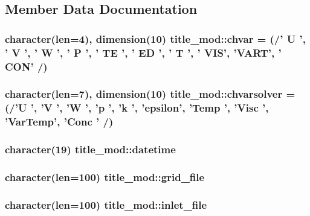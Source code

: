 \subsection{Member Data Documentation}
\hypertarget{classtitle__mod_aab37de0b88867f1916ce8cfc289e98dc}{
\subsubsection[{chvar}]{\setlength{\rightskip}{0pt plus 5cm}character(len=4), dimension(10) title\-\_\-mod\-::chvar = (/' U ', ' V ', ' W ', ' P ', ' T\-E ', ' E\-D ', ' T ', ' V\-I\-S', 'V\-A\-R\-T', ' C\-O\-N' /)}}\label{classtitle__mod_aab37de0b88867f1916ce8cfc289e98dc}
\hypertarget{classtitle__mod_a9472f9f42179093e161523ad2b634549}{
\subsubsection[{chvarsolver}]{\setlength{\rightskip}{0pt plus 5cm}character(len=7), dimension(10) title\-\_\-mod\-::chvarsolver = (/'U ', 'V ', 'W ', 'p ', 'k ', 'epsilon', 'Temp ', 'Visc ', 'Var\-Temp', 'Conc ' /)}}\label{classtitle__mod_a9472f9f42179093e161523ad2b634549}
\hypertarget{classtitle__mod_a8b3004768211b65f2678ca209f6672ba}{
\subsubsection[{datetime}]{\setlength{\rightskip}{0pt plus 5cm}character(19) title\-\_\-mod\-::datetime}}\label{classtitle__mod_a8b3004768211b65f2678ca209f6672ba}
\hypertarget{classtitle__mod_a998c71ccbb4580eb3b5e1bac6ec581d0}{
\subsubsection[{grid\-\_\-file}]{\setlength{\rightskip}{0pt plus 5cm}character(len=100) title\-\_\-mod\-::grid\-\_\-file}}\label{classtitle__mod_a998c71ccbb4580eb3b5e1bac6ec581d0}
\hypertarget{classtitle__mod_a3e8a85e3cce2b0de36e3f09052cd502c}{
\subsubsection[{inlet\-\_\-file}]{\setlength{\rightskip}{0pt plus 5cm}character(len=100) title\-\_\-mod\-::inlet\-\_\-file}}\label{classtitle__mod_a3e8a85e3cce2b0de36e3f09052cd502c}
